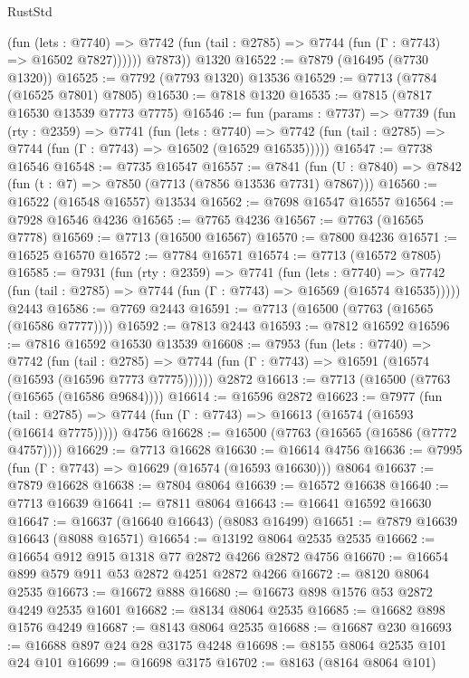 \begin{lexlean}{RustStd}
\begin{coremodule}
              (fun (lets : @7740) =>
              @7742 (fun (tail : @2785) => @7744 (fun (Γ : @7743) => @16502 @7827))))))
        @7873))
    @1320
@16522 := @7879 (@16495 (@7730 @1320))
@16525 := @7792 (@7793 @1320) @13536
@16529 := @7713 (@7784 (@16525 @7801) @7805)
@16530 := @7818 @1320
@16535 := @7815 (@7817 @16530 @13539 @7773 @7775)
@16546 := fun (params : @7737) =>
  @7739
    (fun (rty : @2359) =>
    @7741
      (fun (lets : @7740) =>
      @7742 (fun (tail : @2785) => @7744 (fun (Γ : @7743) => @16502 (@16529 @16535)))))
@16547 := @7738 @16546
@16548 := @7735 @16547
@16557 := @7841
    (fun (U : @7840) => @7842 (fun (t : @7) => @7850 (@7713 (@7856 @13536 @7731) @7867)))
@16560 := @16522 (@16548 @16557) @13534
@16562 := @7698 @16547 @16557
@16564 := @7928 @16546 @4236
@16565 := @7765 @4236
@16567 := @7763 (@16565 @7778)
@16569 := @7713 (@16500 @16567)
@16570 := @7800 @4236
@16571 := @16525 @16570
@16572 := @7784 @16571
@16574 := @7713 (@16572 @7805)
@16585 := @7931
    (fun (rty : @2359) =>
    @7741
      (fun (lets : @7740) =>
      @7742 (fun (tail : @2785) => @7744 (fun (Γ : @7743) => @16569 (@16574 @16535)))))
    @2443
@16586 := @7769 @2443
@16591 := @7713 (@16500 (@7763 (@16565 (@16586 @7777))))
@16592 := @7813 @2443
@16593 := @7812 @16592
@16596 := @7816 @16592 @16530 @13539
@16608 := @7953
    (fun (lets : @7740) =>
    @7742
      (fun (tail : @2785) =>
      @7744 (fun (Γ : @7743) => @16591 (@16574 (@16593 (@16596 @7773 @7775))))))
    @2872
@16613 := @7713 (@16500 (@7763 (@16565 (@16586 @9684))))
@16614 := @16596 @2872
@16623 := @7977
    (fun (tail : @2785) => @7744 (fun (Γ : @7743) => @16613 (@16574 (@16593 (@16614 @7775)))))
    @4756
@16628 := @16500 (@7763 (@16565 (@16586 (@7772 @4757))))
@16629 := @7713 @16628
@16630 := @16614 @4756
@16636 := @7995 (fun (Γ : @7743) => @16629 (@16574 (@16593 @16630))) @8064
@16637 := @7879 @16628
@16638 := @7804 @8064
@16639 := @16572 @16638
@16640 := @7713 @16639
@16641 := @7811 @8064
@16643 := @16641 @16592 @16630
@16647 := @16637 (@16640 @16643) (@8083 @16499)
@16651 := @7879 @16639 @16643 (@8088 @16571)
@16654 := @13192 @8064 @2535 @2535
@16662 := @16654 @912 @915 @1318 @77 @2872 @4266 @2872 @4756
@16670 := @16654 @899 @579 @911 @53 @2872 @4251 @2872 @4266
@16672 := @8120 @8064 @2535
@16673 := @16672 @888
@16680 := @16673 @898 @1576 @53 @2872 @4249 @2535 @1601
@16682 := @8134 @8064 @2535
@16685 := @16682 @898 @1576 @4249
@16687 := @8143 @8064 @2535
@16688 := @16687 @230
@16693 := @16688 @897 @24 @28 @3175 @4248
@16698 := @8155 @8064 @2535 @101 @24 @101
@16699 := @16698 @3175
@16702 := @8163 (@8164 @8064 @101)

\end{coremodule}
\end{lexlean}
